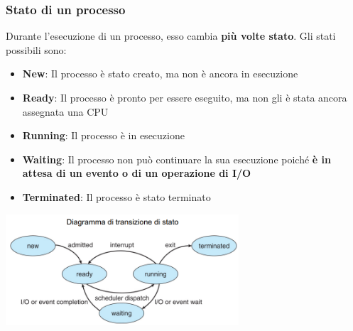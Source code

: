 \documentclass[12pt]{article}
\begin{document}
\subsubsection{Stato di un processo}
Durante l'esecuzione di un processo, esso cambia \textbf{più volte stato}. Gli stati possibili sono:
\begin{itemize}
    \item \textbf{New}: Il processo è stato creato, ma non è ancora in esecuzione
    \item \textbf{Ready}: Il processo è pronto per essere eseguito, ma non gli è stata ancora assegnata una CPU
    \item \textbf{Running}: Il processo è in esecuzione
    \item \textbf{Waiting}: Il processo non può continuare la sua esecuzione poiché \textbf{è in attesa di un evento o di un operazione di I/O}
    \item \textbf{Terminated}: Il processo è stato terminato
\end{itemize}
\begin{center}
    \includegraphics[width = 0.65\textwidth]{Images/54.PNG}
\end{center}
\end{document}
